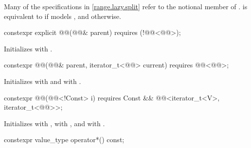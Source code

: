 \pnum
Many of the specifications in \ref{range.lazy.split} refer to the notional member
 of .
 is equivalent to  if 
models , and  otherwise.

%
\begin{itemdecl}
constexpr explicit @@(@@& parent)
  requires (!@@<@@>);
\end{itemdecl}

\begin{itemdescr}
\pnum
\effects
Initializes  with .
\end{itemdescr}

%
\begin{itemdecl}
constexpr @@(@@& parent, iterator_t<@@> current)
  requires @@<@@>;
\end{itemdecl}

\begin{itemdescr}
\pnum
\effects
Initializes  with 
and  with .
\end{itemdescr}

%
\begin{itemdecl}
constexpr @@(@@<!Const> i)
  requires Const && @@<iterator_t<V>, iterator_t<@@>>;
\end{itemdecl}

\begin{itemdescr}
\pnum
\effects
Initializes  with ,
 with , and
 with .
\end{itemdescr}

%
\begin{itemdecl}
constexpr value_type operator*() const;
\end{itemdecl}

